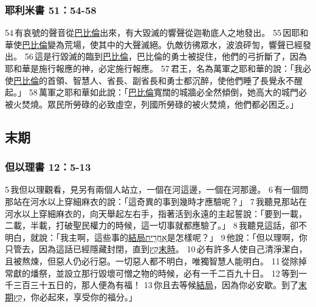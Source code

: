 \subsubsection{耶利米書 51：54-58}
54 有哀號的聲音從\underline{巴比倫}出來，有大毀滅的響聲從迦勒底人之地發出。 55 因耶和華使\underline{巴比倫}變為荒場，使其中的大聲滅絕。仇敵彷彿眾水，波浪砰訇，響聲已經發出。 56 這是行毀滅的臨到\underline{巴比倫}，巴比倫的勇士被捉住，他們的弓折斷了，因為耶和華是施行報應的神，必定施行報應。 57 君王，名為萬軍之耶和華的說：「我必使\underline{巴比倫}的首領、智慧人、省長、副省長和勇士都沉醉，使他們睡了長覺永不醒起。」 58 萬軍之耶和華如此說：「\underline{巴比倫}寬闊的城牆必全然傾倒，她高大的城門必被火焚燒。眾民所勞碌的必致虛空，列國所勞碌的被火焚燒，他們都必困乏。」


\subsection{末期}
\subsubsection{但以理書 12：5-13}
5 我但以理觀看，見另有兩個人站立，一個在河這邊，一個在河那邊。 6 有一個問那站在河水以上穿細麻衣的說：「這奇異的事到幾時才應驗呢？」 7 我聽見那站在河水以上穿細麻衣的，向天舉起左右手，指著活到永遠的主起誓說：「要到一載，二載，半載，打破聖民權力的時候，這一切事就都應驗了。」 8 我聽見這話，卻不明白，就說：「我主啊，這些事的\underline{結局אַחֲרִ֖ית}是怎樣呢？」 9 他說：「但以理啊，你只管去，因為這話已經隱藏封閉，直到\underline{קֵץ末時}。 10 必有許多人使自己清淨潔白，且被熬煉，但惡人仍必行惡。一切惡人都不明白，唯獨智慧人能明白。 11 從除掉常獻的燔祭，並設立那行毀壞可憎之物的時候，必有一千二百九十日。 12 等到一千三百三十五日的，那人便為有福！ 13 你且去等候\underline{結局}，因為你必安歇。到了\underline{末期קֵץ}，你必起來，享受你的福分。」

